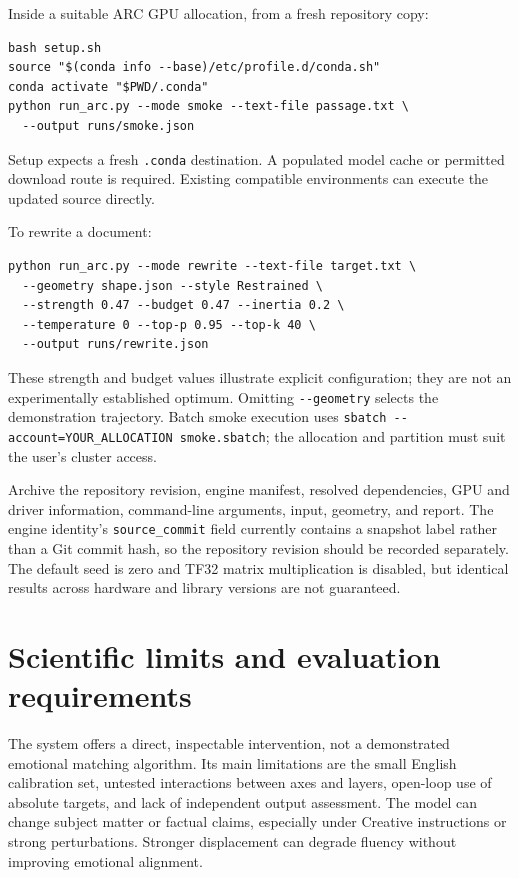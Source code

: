 \documentclass[manuscript,screen,nonacm]{acmart}
\begin{document}
Inside a suitable ARC GPU allocation, from a fresh repository copy:

\begin{verbatim}
bash setup.sh
source "$(conda info --base)/etc/profile.d/conda.sh"
conda activate "$PWD/.conda"
python run_arc.py --mode smoke --text-file passage.txt \
  --output runs/smoke.json
\end{verbatim}

Setup expects a fresh \nolinkurl{.conda} destination. A populated model
cache or permitted download route is required. Existing compatible
environments can execute the updated source directly.

To rewrite a document:

\begin{verbatim}
python run_arc.py --mode rewrite --text-file target.txt \
  --geometry shape.json --style Restrained \
  --strength 0.47 --budget 0.47 --inertia 0.2 \
  --temperature 0 --top-p 0.95 --top-k 40 \
  --output runs/rewrite.json
\end{verbatim}

These strength and budget values illustrate explicit configuration; they
are not an experimentally established optimum. Omitting
\nolinkurl{--geometry} selects the demonstration trajectory. Batch smoke
execution uses
\nolinkurl{sbatch --account=YOUR_ALLOCATION smoke.sbatch}; the
allocation and partition must suit the user's cluster access.

Archive the repository revision, engine manifest, resolved dependencies,
GPU and driver information, command-line arguments, input, geometry, and
report. The engine identity's \nolinkurl{source_commit} field currently
contains a snapshot label rather than a Git commit hash, so the
repository revision should be recorded separately. The default seed is
zero and TF32 matrix multiplication is disabled, but identical results
across hardware and library versions are not guaranteed.

\section{Scientific limits and evaluation
requirements}\label{scientific-limits-and-evaluation-requirements}

The system offers a direct, inspectable intervention, not a demonstrated
emotional matching algorithm. Its main limitations are the small English
calibration set, untested interactions between axes and layers,
open-loop use of absolute targets, and lack of independent output
assessment. The model can change subject matter or factual claims,
especially under Creative instructions or strong perturbations. Stronger
displacement can degrade fluency without improving emotional alignment.
\end{document}

